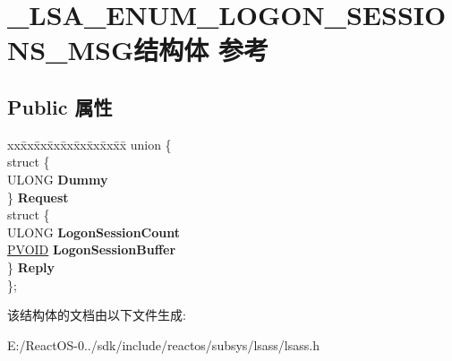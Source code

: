\hypertarget{struct___l_s_a___e_n_u_m___l_o_g_o_n___s_e_s_s_i_o_n_s___m_s_g}{}\section{\+\_\+\+L\+S\+A\+\_\+\+E\+N\+U\+M\+\_\+\+L\+O\+G\+O\+N\+\_\+\+S\+E\+S\+S\+I\+O\+N\+S\+\_\+\+M\+S\+G结构体 参考}
\label{struct___l_s_a___e_n_u_m___l_o_g_o_n___s_e_s_s_i_o_n_s___m_s_g}
\subsection*{Public 属性}
\begin{DoxyCompactItemize}
\item 
\mbox{\label{struct___l_s_a___e_n_u_m___l_o_g_o_n___s_e_s_s_i_o_n_s___m_s_g_a5e0b2b1b670beecdb2b20f22a967d7b6}} 
\begin{tabbing}
xx\=xx\=xx\=xx\=xx\=xx\=xx\=xx\=xx\=\kill
union \{\\
\>struct \{\\
\>\>ULONG {\bfseries Dummy}\\
\>\} {\bfseries Request}\\
\>struct \{\\
\>\>ULONG {\bfseries LogonSessionCount}\\
\>\>\hyperlink{interfacevoid}{PVOID} {\bfseries LogonSessionBuffer}\\
\>\} {\bfseries Reply}\\
\}; \\

\end{tabbing}\end{DoxyCompactItemize}


该结构体的文档由以下文件生成\+:\begin{DoxyCompactItemize}
\item 
E\+:/\+React\+O\+S-\/0../sdk/include/reactos/subsys/lsass/lsass.\+h\end{DoxyCompactItemize}
